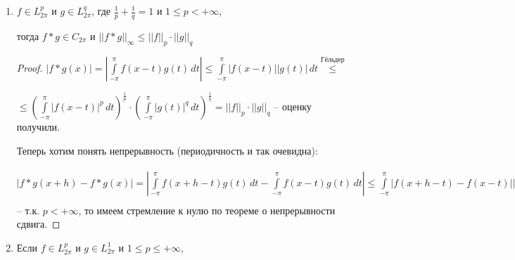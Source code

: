 \begin{properties}
\begin{enumerate}
{            \begin{proof}
                $c_k (f * g) = \frac{1}{2\pi} \int\limits_{-\pi}^\pi e^{-ikx} f*g (x) \, dx = \frac{1}{2\pi} \int\limits_{-\pi}^\pi e^{-ikx} \int\limits_{-\pi}^\pi f(x - t) g(t) \, dt \, dx = \\
                = \frac{1}{2\pi} \int\limits_{-\pi}^\pi \int\limits_{-\pi}^\pi e^{-ik(x - t)}e^{-ikt} f(x - t) g(t) \, dt \, dx =
                \frac{1}{2\pi} \int\limits_{-\pi}^\pi e^{-ikt} g(t) \int\limits_{-\pi}^\pi e^{-ik(x - t)} f(\underbrace{x - t}_{=s}) \, dx \, dt = \\
                = \frac{1}{2\pi} \int\limits_{-\pi}^\pi e^{-ikt} g(t) \int\limits_{x-\pi}^{x+\pi} e^{-iks} f(s) \, ds \, dt  = c_k (f) \int\limits_{-\pi}^\pi e^{-ikt} g(t) \, dt = 2\pi \cdot c_k(f) \cdot c_k(g)$
            \end{proof}
        }
        \item {
            $f \in L_{2\pi}^p$ и $g \in L_{2\pi}^q$, где $\frac{1}{p} + \frac{1}{q} = 1$ и $1 \leq p < +\infty$,

            тогда $f * g \in C_{2\pi}$ и $||f * g||_{\infty} \leqslant ||f||_p \cdot ||g||_q$

            \begin{proof}
                $|f*g (x)| = \left|\int\limits_{-\pi}^\pi f(x - t) g(t) \, dt \right| \leqslant \int\limits_{-\pi}^\pi |f(x-t)||g(t)| \, dt \overset{\text{Гёльдер}}{\leqslant}$

                $\leqslant \left( \int\limits_{-\pi}^\pi |f(x - t)|^p \, dt \right)^{\frac{1}{p}} \cdot \left( \int\limits_{-\pi}^\pi |g(t)|^q \, dt \right)^{\frac{1}{q}} = ||f||_p \cdot ||g||_q$ -- оценку получили.

                Теперь хотим понять непрерывность (периодичность и так очевидна):

                $|f * g(x + h) - f * g (x)| = \left| \int\limits_{-\pi}^\pi f(x + h -t)g(t) \, dt - \int\limits_{-\pi}^\pi f(x - t)g(t) \, dt \right| \leqslant \int\limits_{-\pi}^\pi |f(x + h - t) - f(x - t)||g(t)| \, dt \leqslant
                \left( \int\limits_{-\pi}^\pi|f(x + h - t - f(x - t))|^p \, dt \right)^{\frac{1}{p}} ||g||_q = \left( \int\limits_{-\pi}^\pi |f(s + h) - f(s)|^p \, ds \right)^{\frac{1}{p}} \cdot ||g||_q = \underbrace{||f_h - f||_p}_{\rightarrow 0} ||g||_q$ -- т.к. $p < +\infty$, то имеем стремление к нулю по теореме о непрерывности сдвига.
            \end{proof}
        }
        \item {
            Если $f \in L_{2\pi}^p$ и $g \in L_{2\pi}^1$ и $1 \leq p \leq +\infty$,

}
\end{enumerate}
\end{properties}
